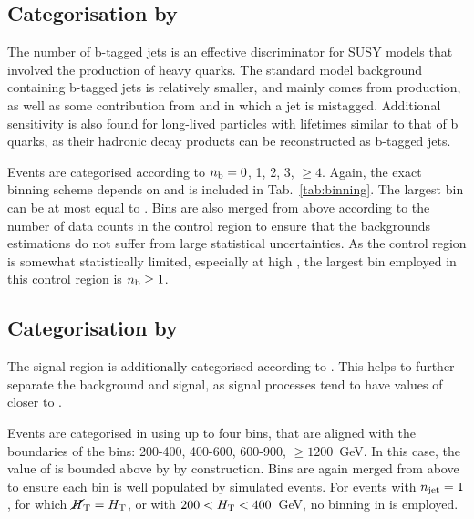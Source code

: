 \subsection*{Categorisation by \nb}

The number of b-tagged jets is an effective discriminator for SUSY %
models that involved the production of heavy quarks. The standard model 
background containing b-tagged jets is relatively smaller, and mainly comes 
from \ttbar production, as well as some contribution from \wj and \zj in which 
a jet is mistagged. Additional sensitivity is also found for long-lived 
particles with lifetimes similar to that of b quarks, as their hadronic decay 
products can be reconstructed as b-tagged jets.

Events are categorised according to $n_{\text{b}} = 0$, 1, 2, 3, $\geq4$.
Again, the exact binning scheme depends on \njet and is included in 
Tab.~\ref{tab:binning}.
The largest \nb bin can be at most equal to \njet. Bins are also merged from 
above according to the number of data counts in the \mj control region to 
ensure that the backgrounds estimations do not suffer from large statistical 
uncertainties.
As the \mmj control region is somewhat statistically limited, especially at 
high \nb, the largest \nb bin employed in this control region is $n_{\text{b}} \geq 1$.

\subsection*{Categorisation by \mht}

The signal region is additionally categorised according to \mht. This helps to 
further separate the background and signal, as signal processes 
tend to have values of \mht closer to \scalht.

Events are categorised in \mht using up to four bins, that are aligned with the 
boundaries of the \scalht bins: 200-400, 400-600, 600-900, $\geq1200$~GeV. In 
this case, the value of \mht is bounded above by \scalht by construction. Bins 
are again merged from above 
to ensure each bin is well populated by simulated events. %
For events with $n_{\text{jet}}=1$, for which 
$\mbox{$\cancel{H}_\text{T}$}=\mbox{$H_\text{T}$}$, or with $200<\mbox{$H_\text{T}$}<400$~GeV, no binning in \mht is employed.


